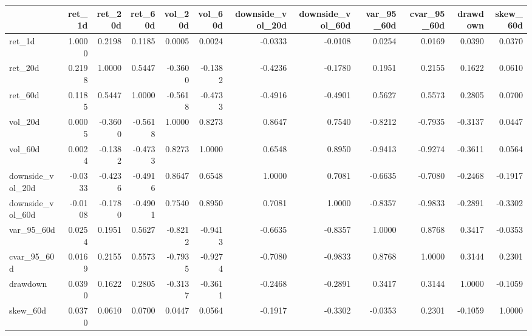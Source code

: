 \begin{tabular}{lrrrrrrrrrrr}
\toprule
 & ret_1d & ret_20d & ret_60d & vol_20d & vol_60d & downside_vol_20d & downside_vol_60d & var_95_60d & cvar_95_60d & drawdown & skew_60d \\
\midrule
ret_1d & 1.0000 & 0.2198 & 0.1185 & 0.0005 & 0.0024 & -0.0333 & -0.0108 & 0.0254 & 0.0169 & 0.0390 & 0.0370 \\
ret_20d & 0.2198 & 1.0000 & 0.5447 & -0.3600 & -0.1382 & -0.4236 & -0.1780 & 0.1951 & 0.2155 & 0.1622 & 0.0610 \\
ret_60d & 0.1185 & 0.5447 & 1.0000 & -0.5618 & -0.4733 & -0.4916 & -0.4901 & 0.5627 & 0.5573 & 0.2805 & 0.0700 \\
vol_20d & 0.0005 & -0.3600 & -0.5618 & 1.0000 & 0.8273 & 0.8647 & 0.7540 & -0.8212 & -0.7935 & -0.3137 & 0.0447 \\
vol_60d & 0.0024 & -0.1382 & -0.4733 & 0.8273 & 1.0000 & 0.6548 & 0.8950 & -0.9413 & -0.9274 & -0.3611 & 0.0564 \\
downside_vol_20d & -0.0333 & -0.4236 & -0.4916 & 0.8647 & 0.6548 & 1.0000 & 0.7081 & -0.6635 & -0.7080 & -0.2468 & -0.1917 \\
downside_vol_60d & -0.0108 & -0.1780 & -0.4901 & 0.7540 & 0.8950 & 0.7081 & 1.0000 & -0.8357 & -0.9833 & -0.2891 & -0.3302 \\
var_95_60d & 0.0254 & 0.1951 & 0.5627 & -0.8212 & -0.9413 & -0.6635 & -0.8357 & 1.0000 & 0.8768 & 0.3417 & -0.0353 \\
cvar_95_60d & 0.0169 & 0.2155 & 0.5573 & -0.7935 & -0.9274 & -0.7080 & -0.9833 & 0.8768 & 1.0000 & 0.3144 & 0.2301 \\
drawdown & 0.0390 & 0.1622 & 0.2805 & -0.3137 & -0.3611 & -0.2468 & -0.2891 & 0.3417 & 0.3144 & 1.0000 & -0.1059 \\
skew_60d & 0.0370 & 0.0610 & 0.0700 & 0.0447 & 0.0564 & -0.1917 & -0.3302 & -0.0353 & 0.2301 & -0.1059 & 1.0000 \\
\bottomrule
\end{tabular}
